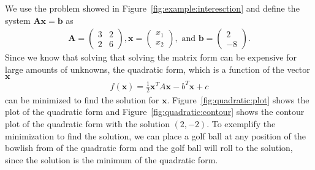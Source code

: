 We use the problem showed in Figure~\ref{fig:example:interesction} and define the system $\mathbf{A} \mathbf{x} = \mathbf{b}$ as
\begin{align*}
\mathbf{A} = \begin{pmatrix}
 3 & 2 \\ 2 & 6 
\end{pmatrix}, \mathbf{x}=\begin{pmatrix}
x_1 \\ x_2  
\end{pmatrix}, \text{ and }  \mathbf{b}=\begin{pmatrix}
2 \\ -8  
\end{pmatrix}\text{.}
\end{align*}
Since we know that solving that solving the matrix form can be expensive for large amounts of unknowns, the quadratic form, which is a function of the vector $\mathbf{x}$
\begin{align}
f(\mathbf{x}) = \frac{1}{2} \mathbf{x}^T A \mathbf{x} - b^T \mathbf{x} + c
\end{align}
can be minimized to find the solution for $\mathbf{x}$. Figure~\ref{fig:quadratic:plot} shows the plot of the quadratic form and Figure~\ref{fig:quadratic:contour} shows the contour plot of the quadratic form with the solution $(2,-2)$. To exemplify  the minimization to find the solution, we can place a golf ball at any position of the bowlish from of the quadratic form and the golf ball will roll to the solution, since the solution is the minimum of the quadratic form.\\

